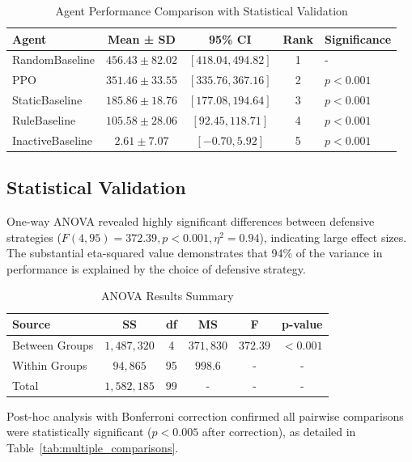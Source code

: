\documentclass[12pt,twoside]{article}
\theoremstyle{definition}
\theoremstyle{plain}
\begin{document}
\begin{table}[H]
\centering
\caption{Agent Performance Comparison with Statistical Validation}
\label{tab:agent_performance}
\begin{tabular}{lcccl}
\toprule
\textbf{Agent} & \textbf{Mean ± SD} & \textbf{95\% CI} & \textbf{Rank} & \textbf{Significance} \\
\midrule
RandomBaseline & $456.43 \pm 82.02$ & $[418.04, 494.82]$ & 1 & - \\
PPO & $351.46 \pm 33.55$ & $[335.76, 367.16]$ & 2 & $p < 0.001$ \\
StaticBaseline & $185.86 \pm 18.76$ & $[177.08, 194.64]$ & 3 & $p < 0.001$ \\
RuleBaseline & $105.58 \pm 28.06$ & $[92.45, 118.71]$ & 4 & $p < 0.001$ \\
InactiveBaseline & $2.61 \pm 7.07$ & $[-0.70, 5.92]$ & 5 & $p < 0.001$ \\
\bottomrule
\end{tabular}
\end{table}

\subsection{Statistical Validation}

One-way ANOVA revealed highly significant differences between defensive strategies ($F(4,95) = 372.39, p < 0.001, \eta^2 = 0.94$), indicating large effect sizes. The substantial eta-squared value demonstrates that 94\% of the variance in performance is explained by the choice of defensive strategy.

\begin{table}[H]
\centering
\caption{ANOVA Results Summary}
\label{tab:anova}
\begin{tabular}{lccccc}
\toprule
\textbf{Source} & \textbf{SS} & \textbf{df} & \textbf{MS} & \textbf{F} & \textbf{p-value} \\
\midrule
Between Groups & $1,487,320$ & 4 & $371,830$ & $372.39$ & $< 0.001$ \\
Within Groups & $94,865$ & 95 & $998.6$ & - & - \\
Total & $1,582,185$ & 99 & - & - & - \\
\bottomrule
\end{tabular}
\end{table}

Post-hoc analysis with Bonferroni correction confirmed all pairwise comparisons were statistically significant ($p < 0.005$ after correction), as detailed in Table~\ref{tab:multiple_comparisons}.
\end{document}
